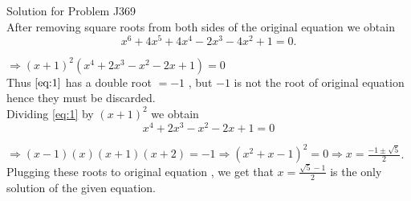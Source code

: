 \documentclass[20pt,a4paper]{extarticle}
\begin{document}
 Solution for Problem J369 \\
 After removing square roots from both sides of the original equation  we obtain\\
 \begin{equation}\label{eq:1}
  x^{6}+4x^{5}+4x^{4}-2x^{3}-4x^{2}+1=0. 
 \end{equation}
 
 $\Rightarrow  (x+1)^{2}(x^{4}+2x^{3}-x^{2}-2x+1)=0$ \\

 Thus  $\ref{eq:1}$  has a double root $=-1$  , but $-1$ is not the root of original equation
 hence they must be discarded.\\
 Dividing  \ref{eq:1}  by $(x+1)^{2}$ we obtain  
 \begin{equation}\label{eq:2}
  x^{4}+2x^{3}-x^{2}-2x+1=0
 \end{equation}
 
 
 $ \Rightarrow  (x-1)(x)(x+1)(x+2)=-1 \Rightarrow  (x^{2}+x-1)^{2}=0
 \Rightarrow  x=\frac{-1\pm \sqrt{5}}{2} $. \\
Plugging these roots to original equation , we get that  $ x= \frac{ \sqrt{5}-1}{2}$ is the only solution of the given equation.
  
\end{document}
